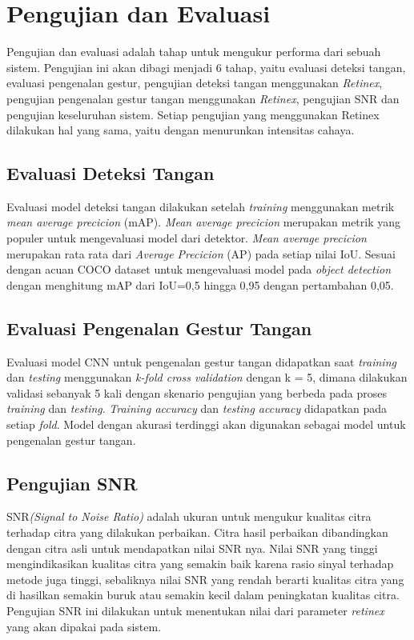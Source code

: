 \section{Pengujian dan Evaluasi}
Pengujian dan evaluasi adalah tahap untuk mengukur performa dari sebuah sistem. Pengujian ini akan dibagi menjadi 6 tahap, yaitu evaluasi deteksi tangan, evaluasi pengenalan gestur, pengujian deteksi tangan menggunakan \emph{Retinex}, pengujian pengenalan gestur tangan menggunakan \emph{Retinex}, pengujian SNR dan pengujian keseluruhan sistem. 
Setiap pengujian yang menggunakan Retinex dilakukan hal yang sama, yaitu dengan menurunkan intensitas cahaya.
\subsection{Evaluasi Deteksi Tangan}
Evaluasi model deteksi tangan dilakukan setelah \emph{training} menggunakan metrik \emph{mean average precicion} (mAP). \emph{Mean average precicion} merupakan metrik yang populer untuk mengevaluasi model dari detektor. \emph{Mean average precicion} merupakan rata rata dari \emph{Average Precicion} (AP) pada setiap nilai IoU. Sesuai dengan acuan COCO dataset untuk mengevaluasi model pada \emph{object detection} dengan menghitung mAP dari IoU=0,5 hingga 0,95 dengan pertambahan 0,05.
\subsection{Evaluasi Pengenalan Gestur Tangan}
Evaluasi model CNN untuk pengenalan gestur tangan didapatkan saat \emph{training} dan \emph{testing} menggunakan \emph{k-fold cross validation} dengan k = 5, dimana dilakukan validasi sebanyak 5 kali dengan skenario pengujian yang berbeda pada proses \emph{training} dan \emph{testing}.
\emph{Training accuracy} dan \emph{testing accuracy} didapatkan pada setiap \emph{fold}. Model dengan akurasi terdinggi akan digunakan sebagai model untuk pengenalan gestur tangan.
\subsection{Pengujian SNR}
SNR\emph{(Signal to Noise Ratio)} adalah ukuran untuk mengukur kualitas citra terhadap citra yang dilakukan perbaikan. Citra hasil perbaikan dibandingkan dengan citra asli untuk mendapatkan nilai SNR nya. Nilai SNR yang tinggi mengindikasikan kualitas citra yang semakin baik karena rasio sinyal terhadap metode juga tinggi, sebaliknya nilai SNR yang rendah berarti kualitas citra yang di hasilkan semakin buruk atau semakin kecil dalam peningkatan kualitas citra. Pengujian SNR ini dilakukan untuk menentukan nilai dari parameter \emph{retinex} yang akan dipakai pada sistem.
